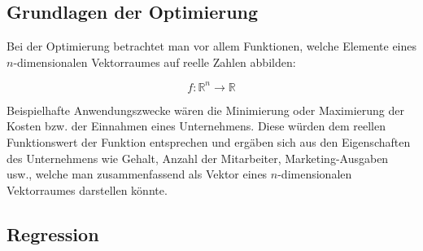 \subsection{Grundlagen der Optimierung}
Bei der Optimierung betrachtet man vor allem Funktionen, welche Elemente eines $n$-dimensionalen Vektorraumes auf reelle Zahlen abbilden:

\begin{equation*}
f: \mathbb{R}^n \rightarrow \mathbb{R}
\end{equation*}

Beispielhafte Anwendungszwecke wären die Minimierung oder Maximierung der Kosten bzw. der Einnahmen eines Unternehmens. Diese würden dem reellen Funktionswert der Funktion entsprechen und ergäben sich aus den Eigenschaften des Unternehmens wie Gehalt, Anzahl der Mitarbeiter, Marketing-Ausgaben usw., welche man zusammenfassend als Vektor eines $n$-dimensionalen Vektorraumes darstellen könnte.

\subsection{Regression}

